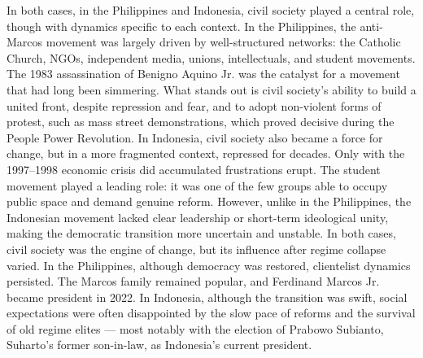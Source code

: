 \documentclass[12pt]{article}
\begin{document}
In both cases, in the Philippines and Indonesia, civil society played a central role, though with dynamics specific to each context. In the Philippines, the anti-Marcos movement was largely driven by well-structured networks: the Catholic Church, NGOs, independent media, unions, intellectuals, and student movements. The 1983 assassination of Benigno Aquino Jr. was the catalyst for a movement that had long been simmering. What stands out is civil society’s ability to build a united front, despite repression and fear, and to adopt non-violent forms of protest, such as mass street demonstrations, which proved decisive during the People Power Revolution.
In Indonesia, civil society also became a force for change, but in a more fragmented context, repressed for decades. Only with the 1997–1998 economic crisis did accumulated frustrations erupt. The student movement played a leading role: it was one of the few groups able to occupy public space and demand genuine reform. However, unlike in the Philippines, the Indonesian movement lacked clear leadership or short-term ideological unity, making the democratic transition more uncertain and unstable.
In both cases, civil society was the engine of change, but its influence after regime collapse varied. In the Philippines, although democracy was restored, clientelist dynamics persisted. The Marcos family remained popular, and Ferdinand Marcos Jr. became president in 2022. In Indonesia, although the transition was swift, social expectations were often disappointed by the slow pace of reforms and the survival of old regime elites — most notably with the election of Prabowo Subianto, Suharto’s former son-in-law, as Indonesia’s current president.

\newpage
\end{document}
